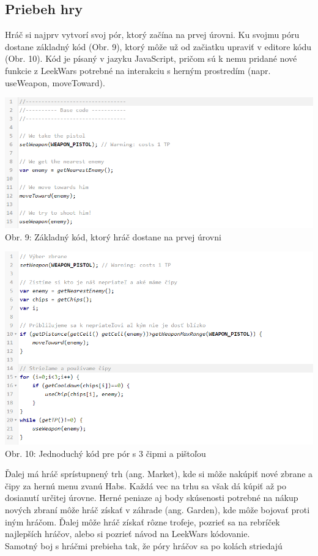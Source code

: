\documentclass[slovak,a4paper,11pt]{article}
\begin{document}
\subsection{Priebeh hry}
Hráč si najprv vytvorí svoj pór, ktorý začína na prvej úrovni. Ku svojmu póru dostane základný kód (Obr. 9), ktorý môže už od začiatku upraviť v editore kódu (Obr. 10). Kód je písaný v jazyku JavaScript, pričom sú k nemu pridané nové funkcie z LeekWars potrebné na interakciu s herným prostredím (napr. useWeapon, moveToward).
\begin{center}
\includegraphics[scale=0.4]{leekwarscode1}
\\ Obr. 9: Základný kód, ktorý hráč dostane na prvej úrovni
\end{center}
\begin{center}
\includegraphics[scale=0.4]{leekwarscode2}
\\ Obr. 10: Jednoduchý kód pre pór s 3 čipmi a pištoľou
\end{center}
Ďalej má hráč sprístupnený trh (ang. Market), kde si môže nakúpiť nové zbrane a čipy za hernú menu zvanú Habs. Každá vec na trhu sa však dá kúpiť až po dosianutí určitej úrovne. Herné peniaze aj body skúsenosti potrebné na nákup nových zbraní môže hráč získať v záhrade (ang. Garden), kde môže bojovať proti iným hráčom. Ďalej môže hráč získať rôzne trofeje, pozrieť sa na rebríček najlepších hráčov, alebo si pozrieť návod na LeekWars kódovanie.\\
Samotný boj s hráčmi prebieha tak, že póry hráčov sa po kolách striedajú
\end{document}

